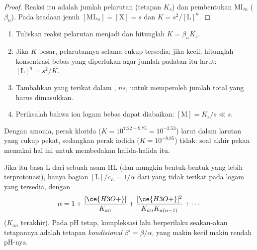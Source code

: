 \begin{proof}
Reaksi itu adalah jumlah pelarutan (tetapan $K_s$) dan pembentukan
$\mathrm{ML}_n$ ($\beta_n$). Pada keadaan jenuh $[\mathrm{ML}_n]
= [\mathrm{X}] = s$ dan $K = s^2/[\mathrm{L}]^n$.
\end{proof}

\begin{method}\label{met:b1:complexation:dissolve-precipitate}
\begin{enumerate}
  \item Tuliskan reaksi pelarutan menjadi  dan hitunglah
        $K = \beta_n K_s$.
  \item Jika $K$ besar, pelarutannya  selama  cukup
        tersedia; jika kecil, hitunglah konsentrasi  bebas yang
        diperlukan agar jumlah padatan itu larut:
        $[\mathrm{L}]^n = s^2/K$.
  \item Tambahkan  yang terikat dalam , $n s$, untuk
        memperoleh jumlah total  yang harus dimasukkan.
  \item Periksalah bahwa ion logam bebas dapat diabaikan:
        $[\mathrm{M}] = K_s/s
        \ll s$.
\end{enumerate}
\end{method}

Dengan amonia, perak klorida ($K = 10^{7.22 - 9.75} = 10^{-2.53}$) larut
dalam larutan yang cukup pekat, sedangkan perak iodida
($K = 10^{-8.85}$) tidak: soal akhir pekan memakai hal ini untuk
membedakan halida-halida itu.

\begin{proposition}\label{prop:b1:complexation:ligand-acidity}
Jika  itu basa $\mathrm{L}$ dari sebuah asam $\mathrm{HL}$ (dan
mungkin bentuk-bentuk yang lebih terprotonasi), hanya bagian
$[\mathrm{L}]/c_L =
1/\alpha$ dari  yang tidak terikat pada logam
yang tersedia, dengan
\[
  \alpha = 1 + \frac{[\ce{H3O+}]}{K_{an}} + \frac{[\ce{H3O+}]^2}{K_{an}K_{a(n-1)}}
  + \cdots
\]
($K_{an}$  terakhir). Pada pH tetap, kompleksasi lalu
berperilaku seakan-akan tetapannya adalah tetapan \emph{kondisional}
$\beta' = \beta/\alpha$, yang makin kecil makin rendah pH-nya.
\end{proposition}

